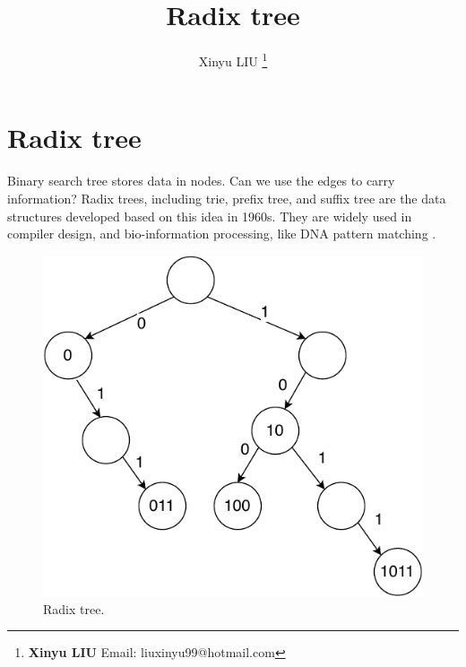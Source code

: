 \documentclass[b5paper]{article}
\begin{document}
\title{Radix tree}

\author{Xinyu LIU
\thanks{{\bfseries Xinyu LIU} \newline
  Email: liuxinyu99@hotmail.com \newline}
  }

\maketitle
\fi


\ifx\wholebook\relax
\chapter{Radix tree}
\fi

\label{introduction} 

Binary search tree stores data in nodes. Can we use the edges to carry information? Radix trees, including trie, prefix tree, and suffix tree are the data structures developed based on this idea in 1960s. They are widely used in compiler design\cite{okasaki-int-map}, and bio-information processing, like DNA pattern matching \cite{wiki-suffix-tree}.

\begin{figure}[htbp]
  \centering
  \includegraphics[scale=0.6, page=1]{img/trie}
  \caption{Radix tree.}
  \label{fig:radix-tree}
\end{figure}
\end{document}
